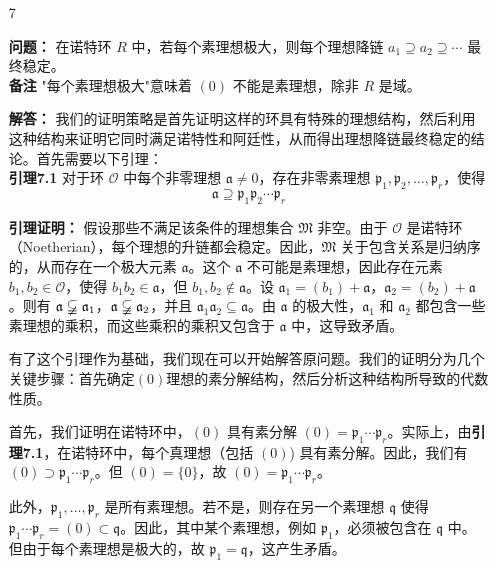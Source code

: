 \documentclass[UTF8]{ctexart}
\begin{document}
\begin{enumerate}
\begin{enumerate}
\item[7]

\textbf{问题：} 在诺特环 \(R\) 中，若每个素理想极大，则每个理想降链 \(a_1 \supseteq a_2 \supseteq \cdots\) 最终稳定。\\
\textbf{备注} "每个素理想极大"意味着 \((0)\) 不能是素理想，除非 \(R\) 是域。

\textbf{解答：} 
我们的证明策略是首先证明这样的环具有特殊的理想结构，然后利用这种结构来证明它同时满足诺特性和阿廷性，从而得出理想降链最终稳定的结论。首先需要以下引理：\\

\textbf{引理7.1} 对于环 \(\mathcal{O}\) 中每个非零理想 \(\mathfrak{a} \neq 0\)，存在非零素理想 \(\mathfrak{p}_1, \mathfrak{p}_2, \ldots, \mathfrak{p}_r\)，使得
\[
\mathfrak{a} \supseteq \mathfrak{p}_1 \mathfrak{p}_2 \cdots \mathfrak{p}_r
\]

\textbf{引理证明：} 假设那些不满足该条件的理想集合 \(\mathfrak{M}\) 非空。由于 \(\mathcal{O}\) 是诺特环（Noetherian），每个理想的升链都会稳定。因此，\(\mathfrak{M}\) 关于包含关系是归纳序的，从而存在一个极大元素 \(\mathfrak{a}\)。这个 \(\mathfrak{a}\) 不可能是素理想，因此存在元素 \(b_1, b_2 \in \mathcal{O}\)，使得 \(b_1 b_2 \in \mathfrak{a}\)，但 \(b_1, b_2 \notin \mathfrak{a}\)。设 \(\mathfrak{a}_1 = (b_1) + \mathfrak{a}\)，\(\mathfrak{a}_2 = (b_2) + \mathfrak{a}\)。则有 \(\mathfrak{a} \varsubsetneqq \mathfrak{a}_1\)，\(\mathfrak{a} \varsubsetneqq \mathfrak{a}_2\)，并且 \(\mathfrak{a}_1 \mathfrak{a}_2 \subseteq \mathfrak{a}\)。由 \(\mathfrak{a}\) 的极大性，\(\mathfrak{a}_1\) 和 \(\mathfrak{a}_2\) 都包含一些素理想的乘积，而这些乘积的乘积又包含于 \(\mathfrak{a}\) 中，这导致矛盾。

有了这个引理作为基础，我们现在可以开始解答原问题。我们的证明分为几个关键步骤：首先确定\((0)\)理想的素分解结构，然后分析这种结构所导致的代数性质。

首先，我们证明在诺特环中，\((0)\) 具有素分解 \((0) = \mathfrak{p}_1 \cdots \mathfrak{p}_r\)。实际上，由\textbf{引理7.1}，在诺特环中，每个真理想（包括 \((0)\)) 具有素分解。因此，我们有 \((0) \supset \mathfrak{p}_1 \cdots \mathfrak{p}_r\)。但 \((0) = \{0\}\)，故 \((0) = \mathfrak{p}_1 \cdots \mathfrak{p}_r\)。

此外，\(\mathfrak{p}_1, \dots, \mathfrak{p}_r\) 是所有素理想。若不是，则存在另一个素理想 \(\mathfrak{q}\) 使得 \(\mathfrak{p}_1 \cdots \mathfrak{p}_r = (0) \subset \mathfrak{q}\)。因此，其中某个素理想，例如 \(\mathfrak{p}_1\)，必须被包含在 \(\mathfrak{q}\) 中。但由于每个素理想是极大的，故 \(\mathfrak{p}_1 = \mathfrak{q}\)，这产生矛盾。


\end{enumerate}
\end{enumerate}
\end{document}
